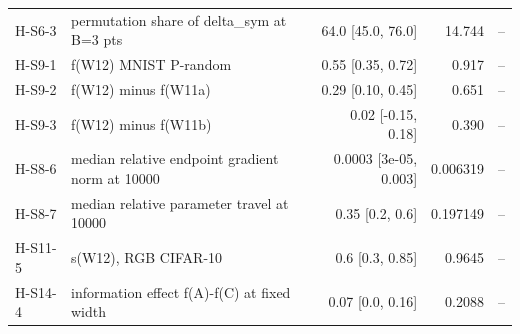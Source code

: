 \begin{table}[t]
\begin{tabular}{@{}llrrl@{}}
H-S6-3 & permutation share of delta\_sym at B=3 pts & 64.0 [45.0, 76.0] & 14.744 & -- \\
H-S9-1 & f(W12) MNIST P-random & 0.55 [0.35, 0.72] & 0.917 & -- \\
H-S9-2 & f(W12) minus f(W11a) & 0.29 [0.10, 0.45] & 0.651 & -- \\
H-S9-3 & f(W12) minus f(W11b) & 0.02 [-0.15, 0.18] & 0.390 & -- \\
H-S8-6 & median relative endpoint gradient norm at 10000 & 0.0003 [3e-05, 0.003] & 0.006319 & -- \\
H-S8-7 & median relative parameter travel at 10000 & 0.35 [0.2, 0.6] & 0.197149 & -- \\
H-S11-5 & s(W12), RGB CIFAR-10 & 0.6 [0.3, 0.85] & 0.9645 & -- \\
H-S14-4 & information effect f(A)-f(C) at fixed width & 0.07 [0.0, 0.16] & 0.2088 & -- \\
\bottomrule
\end{tabular}
\end{table}
